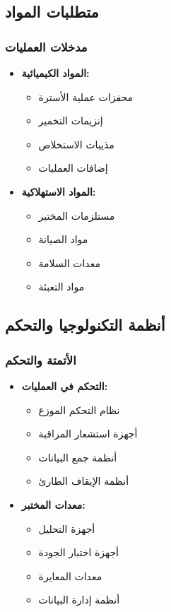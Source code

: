 \subsection{متطلبات المواد}

\subsubsection{مدخلات العمليات}
\begin{itemize}
    \item \textbf{المواد الكيميائية:}
    \begin{itemize}
        \item محفزات عملية الأسترة
        \item إنزيمات التخمير
        \item مذيبات الاستخلاص
        \item إضافات العمليات
    \end{itemize}
    
    \item \textbf{المواد الاستهلاكية:}
    \begin{itemize}
        \item مستلزمات المختبر
        \item مواد الصيانة
        \item معدات السلامة
        \item مواد التعبئة
    \end{itemize}
\end{itemize}

\subsection{أنظمة التكنولوجيا والتحكم}

\subsubsection{الأتمتة والتحكم}
\begin{itemize}
    \item \textbf{التحكم في العمليات:}
    \begin{itemize}
        \item نظام التحكم الموزع
        \item أجهزة استشعار المراقبة
        \item أنظمة جمع البيانات
        \item أنظمة الإيقاف الطارئ
    \end{itemize}
    
    \item \textbf{معدات المختبر:}
    \begin{itemize}
        \item أجهزة التحليل
        \item أجهزة اختبار الجودة
        \item معدات المعايرة
        \item أنظمة إدارة البيانات
    \end{itemize}
\end{itemize}
